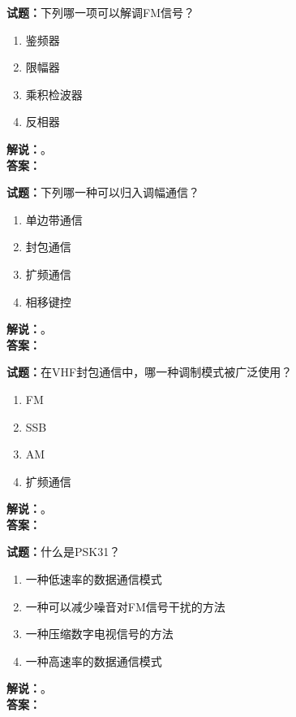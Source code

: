 \documentclass{ctexbook}
\begin{document}
\bigskip

\noindent\textbf{试题：}下列哪一项可以解调FM信号？
\begin{enumerate}[leftmargin=3em]
  \item 鉴频器
  \item 限幅器
  \item 乘积检波器
  \item 反相器
\end{enumerate}
\noindent\textbf{解说：}\textbf{}。\\\noindent\textbf{答案：}

\bigskip

\noindent\textbf{试题：}下列哪一种可以归入调幅通信？
\begin{enumerate}[leftmargin=3em]
  \item 单边带通信
  \item 封包通信
  \item 扩频通信
  \item 相移键控
\end{enumerate}
\noindent\textbf{解说：}\textbf{}。\\\noindent\textbf{答案：}

\bigskip

\noindent\textbf{试题：}在VHF封包通信中，哪一种调制模式被广泛使用？
\begin{enumerate}[leftmargin=3em]
  \item FM
  \item SSB
  \item AM
  \item 扩频通信
\end{enumerate}
\noindent\textbf{解说：}\textbf{}。\\\noindent\textbf{答案：}

\bigskip

\noindent\textbf{试题：}什么是PSK31？
\begin{enumerate}[leftmargin=3em]
  \item 一种低速率的数据通信模式
  \item 一种可以减少噪音对FM信号干扰的方法
  \item 一种压缩数字电视信号的方法
  \item 一种高速率的数据通信模式
\end{enumerate}
\noindent\textbf{解说：}\textbf{}。\\\noindent\textbf{答案：}

\bigskip
\end{document}
